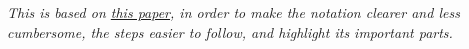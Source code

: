 {\itshape%
	This is based on \href{https://doi.org/10.1109%2FTASL.2006.889720}{\emph{this paper}}, in order to make the notation clearer and less cumbersome, the steps easier to follow, and highlight its important parts.
}